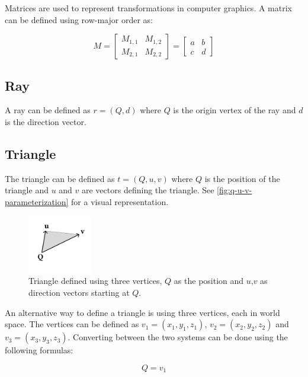 Matrices are used to represent transformations in computer graphics. A matrix can be defined using row-major order as:

\begin{equation}
  \label{eqn:matrix}
  M = \begin{bmatrix} M_{1,1} & M_{1,2} \\ M_{2,1} & M_{2,2} \end{bmatrix} = \begin{bmatrix} a & b \\ c & d \end{bmatrix}
\end{equation}

\subsection{Ray}

A ray can be defined as $r = (Q, d)$ where $Q$ is the origin vertex of the ray and $d$ is the direction vector.

\subsection{Triangle}

The triangle can be defined as $t = (Q, u, v)$ where $Q$ is the position of the triangle and $u$ and $v$ are vectors defining the triangle. See \autoref{fig:q-u-v-parameterization} for a visual representation.

\begin{figure}[H]
  \centering
  \includegraphics[width=0.25\textwidth]{resources/q-u-v-parameterization.png}
  \caption{Triangle defined using three vertices, $Q$ as the position and $u$,$v$ as direction vectors starting at $Q$.}
  \label{fig:q-u-v-parameterization}
\end{figure}

An alternative way to define a triangle is using three vertices, each in world space. The vertices can be defined as $v_1 = (x_1, y_1, z_1)$, $v_2 = (x_2, y_2, z_2)$ and $v_3 = (x_3, y_3, z_3)$. Converting between the two systems can be done using the following formulas:

\begin{equation}
  \label{eqn:triangle-vertices-to-q-u-v}
  Q = v_1
\end{equation}

